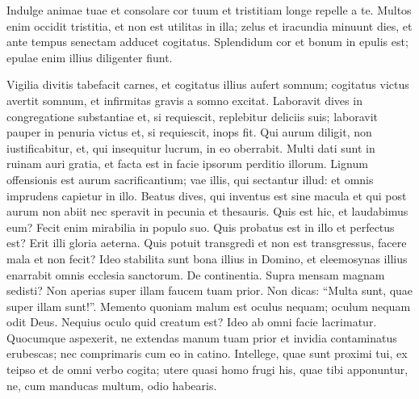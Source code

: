 \begin{biblechapter}
\begin{biblechapter}
\begin{biblechapter}
\begin{biblechapter}
\begin{biblechapter}
\begin{biblechapter}
\begin{biblechapter}
\begin{biblechapter}
\begin{biblechapter}
\begin{biblechapter}
\begin{biblechapter}
\begin{biblechapter}
\begin{biblechapter}
\begin{biblechapter}
\begin{biblechapter}
\begin{biblechapter}
\begin{biblechapter}
\begin{biblechapter}
\begin{biblechapter}
\begin{biblechapter}
\begin{biblechapter}
\begin{biblechapter}
\begin{biblechapter}
\begin{biblechapter}
\begin{biblechapter}
\begin{biblechapter}
\begin{biblechapter}
\begin{biblechapter}
\begin{biblechapter}
\begin{biblechapter}
 \verse Indulge animae tuae et consolare cor tuum
 et tristitiam longe repelle a te.
 \verse Multos enim occidit tristitia,
 et non est utilitas in illa;
 \verse zelus et iracundia minuunt dies,
 et ante tempus senectam adducet cogitatus.
 \verse Splendidum cor et bonum in epulis est;
 epulae enim illius diligenter fiunt.
 
\begin{biblechapter}
\verse Vigilia divitis tabefacit carnes,
 et cogitatus illius aufert somnum;
 \verse cogitatus victus avertit somnum,
 et infirmitas gravis a somno excitat.
 \verse Laboravit dives in congregatione substantiae
 et, si requiescit, replebitur deliciis suis;
 \verse laboravit pauper in penuria victus
 et, si requiescit, inops fit.
 \verse Qui aurum diligit, non iustificabitur,
 et, qui insequitur lucrum, in eo oberrabit.
 \verse Multi dati sunt in ruinam auri gratia,
 et facta est in facie ipsorum perditio illorum.
 \verse Lignum offensionis est aurum sacrificantium;
 vae illis, qui sectantur illud:
 et omnis imprudens capietur in illo.
 \verse Beatus dives, qui inventus est sine macula
 et qui post aurum non abiit
 nec speravit in pecunia et thesauris.
 \verse Quis est hic, et laudabimus eum?
 Fecit enim mirabilia in populo suo.
 \verse Quis probatus est in illo et perfectus est?
 Erit illi gloria aeterna.
 Quis potuit transgredi et non est transgressus,
 facere mala et non fecit?
 \verse Ideo stabilita sunt bona illius in Domino,
 et eleemosynas illius enarrabit omnis ecclesia sanctorum.
 \verse De continentia.
 Supra mensam magnam sedisti?
 Non aperias super illam faucem tuam prior.
 \verse Non dicas: “Multa sunt, quae super illam sunt!”.
 \verse Memento quoniam malum est oculus nequam;
 oculum nequam odit Deus.
 \verse Nequius oculo quid creatum est?
 Ideo ab omni facie lacrimatur.
 \verse Quocumque aspexerit, ne extendas manum tuam prior
 et invidia contaminatus erubescas;
 \verse nec comprimaris cum eo in catino.
 \verse Intellege, quae sunt proximi tui, ex teipso
 et de omni verbo cogita;
 \verse utere quasi homo frugi his, quae tibi apponuntur,
 ne, cum manducas multum, odio habearis.

\end{biblechapter}
\end{biblechapter}
\end{biblechapter}
\end{biblechapter}
\end{biblechapter}
\end{biblechapter}
\end{biblechapter}
\end{biblechapter}
\end{biblechapter}
\end{biblechapter}
\end{biblechapter}
\end{biblechapter}
\end{biblechapter}
\end{biblechapter}
\end{biblechapter}
\end{biblechapter}
\end{biblechapter}
\end{biblechapter}
\end{biblechapter}
\end{biblechapter}
\end{biblechapter}
\end{biblechapter}
\end{biblechapter}
\end{biblechapter}
\end{biblechapter}
\end{biblechapter}
\end{biblechapter}
\end{biblechapter}
\end{biblechapter}
\end{biblechapter}
\end{biblechapter}
